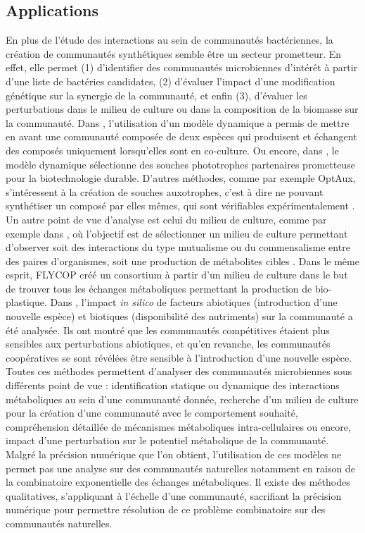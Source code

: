 \documentclass[../main.tex]{subfiles}
\begin{document}
\subsection{Applications}
En plus de l'étude des interactions au sein de communautés bactériennes, la création de communautés synthétiques semble être un secteur prometteur. En effet, elle permet (1) d'identifier des communautés microbiennes d'intérêt à partir d'une liste de bactéries candidates, (2) d'évaluer l'impact d'une modification génétique sur la synergie de la communauté, et enfin (3), d'évaluer les perturbations dans le milieu de culture ou dans la composition de la biomasse sur la communauté. Dans \citep{Chiu2014}, l'utilisation d'un modèle dynamique a permis de mettre en avant une communauté composée de deux espèces qui produisent et échangent des composés uniquement lorsqu'elles sont en co-culture. Ou encore, dans \citep{Zuniga2020}, le modèle dynamique sélectionne des souches phototrophes partenaires prometteuse pour la biotechnologie durable. D'autres méthodes, comme par exemple OptAux, s'intéressent à la création de souches auxotrophes, c'est à dire ne pouvant synthétiser un composé par elles mêmes, qui sont vérifiables expérimentalement \citep{Lloyd2019}. Un autre point de vue d'analyse est celui du milieu de culture, comme par exemple dans \citep{Klitgord2010}, où l'objectif est de sélectionner un milieu de culture permettant d'observer soit des interactions du type mutualisme ou du commensalisme entre des paires d'organismes, soit une production de métabolites cibles \citep{Pacheco2021}. Dans le même esprit, FLYCOP \citep{Garcia-Jimenez2018} créé un consortium à partir d'un milieu de culture dans le but de trouver tous les échanges métaboliques permettant la production de bio-plastique. Dans \citep{Machado2021},  l'impact  \textit{in silico} de facteurs abiotiques (introduction d'une nouvelle espèce) et biotiques (disponibilité des nutriments) sur la communauté a été analysée. Ils ont montré que les communautés compétitives étaient plus sensibles aux perturbations abiotiques, et qu'en revanche, les communautés coopératives se sont révélées être sensible à l'introduction d'une nouvelle espèce. \\

Toutes ces méthodes permettent d'analyser des communautés microbiennes sous différents point de vue : identification statique ou dynamique des interactions métaboliques au sein d'une communauté donnée, recherche d'un milieu de culture pour la création d'une communauté avec le comportement souhaité, compréhension détaillée de mécanismes métaboliques intra-cellulaires ou encore, impact d'une perturbation sur le potentiel métabolique de la communauté. Malgré la précision numérique que l'on obtient, l'utilisation de ces modèles ne permet pas une analyse sur des communautés naturelles notamment en raison de la combinatoire exponentielle des échanges métaboliques. Il existe des méthodes qualitatives, s'appliquant à l'échelle d'une communauté, sacrifiant la précision numérique pour permettre résolution de ce problème combinatoire sur des communautés naturelles. 
\end{document}
